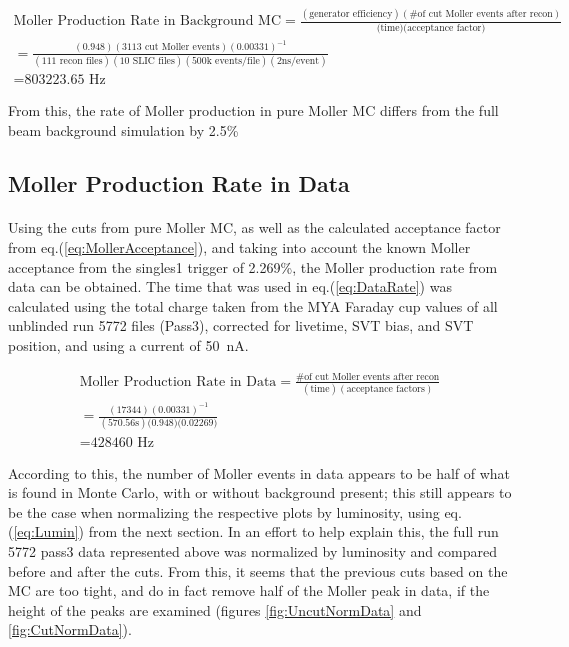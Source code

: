 \documentclass{article}
\begin{document}
	\begin{equation} \label{eq:BeamTriRate}
	\begin{split}
  	\mbox{Moller Production Rate in Background MC} =\frac{(\mbox{generator efficiency})(\mbox{\# of cut Moller events after recon})}{\mbox{(time)({acceptance factor})}} \\
  	= \frac{(0.948)(3113\mbox{ cut Moller events})(0.00331)^{-1}}{(\mbox{111 recon files})(\mbox{10 SLIC files})(\mbox{500k events/file})(\mbox{2ns/event})}\\= \mbox{803223.65 Hz}
  	\end{split}
	\end{equation}
	
	From this, the rate of Moller production in pure Moller MC differs from the full beam background simulation by \mbox{2.5\%}

	\subsection{Moller Production Rate in Data}
	\paragraph{}
	Using the cuts from pure Moller MC, as well as the calculated acceptance factor from eq.(\ref{eq:MollerAcceptance}), and taking into account the known Moller acceptance from the singles1 trigger of \mbox{2.269\%}, the Moller production rate from data can be obtained. The time that was used in eq.(\ref{eq:DataRate}) was calculated using the total charge taken from the MYA Faraday cup values of all unblinded run 5772 files (Pass3), corrected for livetime, SVT bias, and SVT position, and using a current of \mbox{50 nA}.
	
	\begin{equation} \label{eq:DataRate}
	\begin{split}
  	\mbox{Moller Production Rate in Data}= \frac{\mbox{\# of cut Moller events after recon}}{(\mbox{time})(\mbox{acceptance factors})}\\
  	= \frac{(\mbox{17344})(0.00331)^{-1}}{(\mbox{570.56s})\mbox{(0.948)(0.02269)}}\\= \mbox{428460 Hz}
  	\end{split}
	\end{equation}
	
According to this, the number of Moller events in data appears to be half of what is found in Monte Carlo, with or without background present; this still appears to be the case when normalizing the respective plots by luminosity, using eq.(\ref{eq:Lumin}) from the next section. In an effort to help explain this, the full run 5772 pass3 data represented above was normalized by luminosity and compared before and after the cuts. From this, it seems that the previous cuts based on the MC are too tight, and do in fact remove half of the Moller peak in data, if the height of the peaks are examined (figures \ref{fig:UncutNormData} and \ref{fig:CutNormData}).
\end{document}
